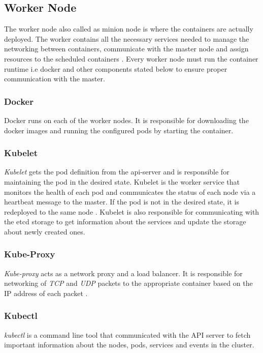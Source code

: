 \documentclass[9pt,twocolumn,twoside]{../../styles/osajnl}
\begin{document}
{\subsection{Worker Node}
The worker node also called as minion node is where the containers are
actually deployed. The worker contains all the necessary services
needed to manage the networking between containers, communicate with
the master node and assign resources to the scheduled containers
\cite{www-kubernetes-architecture}. Every worker node must run the
container runtime i.e docker and other components stated below to
ensure proper communication with the master.

\subsubsection{Docker}
Docker runs on each of the worker nodes. It is responsible for
downloading the docker images and running the configured pods by
starting the container.

\subsubsection{Kubelet}
\emph{Kubelet} gets the pod definition from the api-server and is
responsible for maintaining the pod in the desired state. Kubelet is
the worker service that monitors the health of each pod and
communicates the status of each node via a heartbeat message to the
master. If the pod is not in the desired state, it is redeployed to
the same node \cite{www-wiki-kubernetes}. Kubelet is also responsible
for communicating with the etcd storage to get information about the
services and update the storage about newly created ones.

\subsubsection{Kube-Proxy}
\emph{Kube-proxy} acts as a network proxy and a load balancer. It is
responsible for networking of \emph{TCP} and \emph{UDP} packets to the
appropriate container based on the IP address of each packet
\cite{www-wiki-kubernetes} \cite{www-kubernetes-architecture}.

\subsubsection{Kubectl}
\emph{kubectl} is a command line tool that communicated with the API
server to fetch important information about the nodes, pods, services
and events in the cluster.


}
\end{document}
